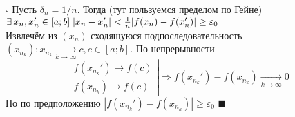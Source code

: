 \documentclass[a4paper,12pt]{article}
\theoremstyle{plain}
\theoremstyle{definition}
\theoremstyle{remark}
\newenvironment{ittproof}{$\square$ }{ $\blacksquare$ \\}
\begin{document}
\begin{enumerate}
\begin{ittproof}
      Пусть $\delta_n = 1/n $. Тогда (тут пользуемся пределом по Гейне)       
      $\exists\, x_n,x_n' \in [a;b]\; |x_n - x_n'| < {1\over n} |f(x_n) - f(x_n')| 
      \geq \varepsilon_0 $ \\
      Извлечём из $(x_n)$  сходящуюся подпоследовательность 
      $(x_{n_k}) : x_{n_k} \xrightarrow[k \to \infty]{} c, c \in [a;b]$.
      По непрерывности
      $$
      \left.
      \begin{array}{c}
        f(x_{n_k}') \to f(c) \\
        f(x_{n_k}) \to f(c) 
      \end{array} \right| \Rightarrow 
      f(x_{n_k}') - f(x_{n_k}) \xrightarrow[k \to \infty]{} 0
      $$
      Но по предположению $| f(x_{n_k}') - f(x_{n_k})| \geq \varepsilon_0$
    \end{ittproof}
\end{enumerate}
\end{document}
